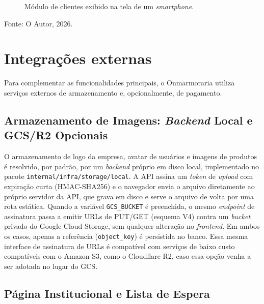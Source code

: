 \begin{figure}[H]
  \centering
  \captionsetup{justification=centering}
  \caption{Módulo de clientes exibido na tela de um \textit{smartphone}.}
  \label{fig:mobile-clientes}
\end{figure}
{\centering\small Fonte: O Autor, 2026.\par}
\vspace{0.8em}

\section{Integrações externas}

Para complementar as funcionalidades principais, o Onmarmoraria utiliza serviços externos de armazenamento e, opcionalmente, de pagamento.

\subsection{Armazenamento de Imagens: \textit{Backend} Local e GCS/R2 Opcionais}
\label{sec:armazenamento-imagens}

O armazenamento de logo da empresa, avatar de usuários e imagens de produtos é resolvido, por padrão, por um \textit{backend} próprio em disco local, implementado no pacote \texttt{internal/\allowbreak infra/\allowbreak storage/\allowbreak local}. A API assina um \textit{token} de \textit{upload} com expiração curta (HMAC-SHA256) e o navegador envia o arquivo diretamente ao próprio servidor da API, que grava em disco e serve o arquivo de volta por uma rota estática. Quando a variável \texttt{GCS\_BUCKET} é preenchida, o mesmo \textit{endpoint} de assinatura passa a emitir URLs de PUT/GET (esquema V4) contra um \textit{bucket} privado do Google Cloud Storage, sem qualquer alteração no \textit{frontend}. Em ambos os casos, apenas a referência (\texttt{object\_key}) é persistida no banco. Essa mesma interface de assinatura de URLs é compatível com serviços de baixo custo compatíveis com o Amazon S3, como o Cloudflare R2, caso essa opção venha a ser adotada no lugar do GCS.

\subsection{Página Institucional e Lista de Espera}

